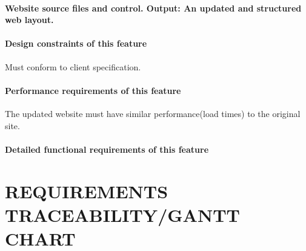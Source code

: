 \documentclass[letterpaper, 10pt, draftclsnofoot, onecolumn]{IEEEtran}
\begin{document}
{\paragraph[Input/Output sequence for this
feature]{\rmfamily\bfseries\color{black}
Website source files and control. Output: An updated and structured web layout.}

\paragraph[Design constraints of this
feature]{\rmfamily\bfseries\color{black} Design
constraints of this feature}
{\color{black}
Must conform to client specification.}

\paragraph[Performance requirements of this
feature]{\rmfamily\bfseries\color{black}
Performance requirements of this feature}
{\color{black}
The updated website must have similar performance(load times) to the original site.}

\paragraph[Detailed functional requirements of this
feature]{\rmfamily\bfseries\color{black}
Detailed functional requirements of this feature}








\clearpage\setcounter{page}{1}\pagestyle{Convertvi}
\section[REQUIREMENTS
TRACEABILITY]{\rmfamily\bfseries\color{black}
REQUIREMENTS TRACEABILITY/GANTT CHART}

\begin{comment}

{\selectlanguage{english}\itshape\color{black}
This section shall contain traceability information from each system
requirement in this specification to the system (or subsystem, if
applicable) requirements it addresses. \ A tabular form is preferred,
but not mandatory.}


\bigskip


\end{comment}}
\end{document}
